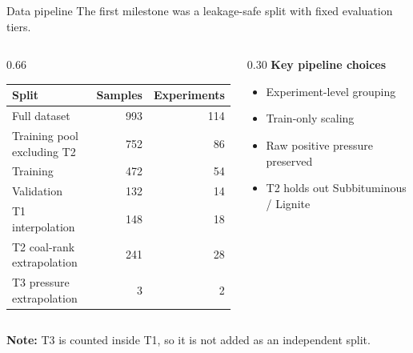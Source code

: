 \documentclass[aspectratio=169,10pt]{beamer}
\newcommand{\smallgray}[1]{\textcolor{projectGray}{#1}}
\begin{document}
\begin{frame}{Data pipeline}
  \smallgray{The first milestone was a leakage-safe split with fixed evaluation tiers.}

  \vspace{0.25cm}
  \begin{columns}[T,onlytextwidth]
    \begin{column}{0.66\textwidth}
      \begin{table}
        \centering
        \scriptsize
        \begin{tabular}{lrr}
          \toprule
          \textbf{Split}                 & \textbf{Samples} & \textbf{Experiments} \\
          \midrule
          Full dataset                   & 993              & 114                  \\
          Training pool excluding T2     & 752              & 86                   \\
          Training                       & 472              & 54                   \\
          Validation                     & 132              & 14                   \\
          T1 interpolation               & 148              & 18                   \\
          T2 coal-rank extrapolation     & 241              & 28                   \\
          T3 pressure extrapolation      & 3                & 2                    \\
          \bottomrule
        \end{tabular}
      \end{table}
    \end{column}
    \begin{column}{0.30\textwidth}
      \textbf{Key pipeline choices}
      \begin{itemize}
        \item Experiment-level grouping
        \item Train-only scaling
        \item Raw positive pressure preserved
        \item T2 holds out Subbituminous / Lignite
      \end{itemize}
    \end{column}
  \end{columns}

  \vspace{0.12cm}
  \smallgray{\textbf{Note:} T3 is counted inside T1, so it is not added as an independent split.}
\end{frame}
\end{document}
